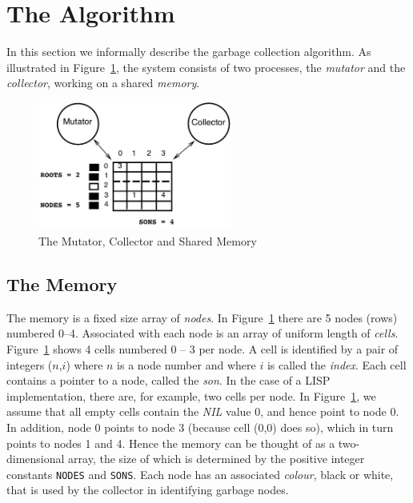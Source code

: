          
\section{The Algorithm}
\label{informal-specification}

In  this  section   we  informally  describe the   garbage  collection
algorithm.   As illustrated  in    Figure~\ref{gc-figure}, the  system
consists of two processes, the  {\em mutator} and the {\em collector},
working on a shared {\em memory}.

\begin{figure}[htb]
\center
\includegraphics[width=2.5in]{gc-fig.jpeg}
\caption{The Mutator, Collector and Shared Memory}
\label{gc-figure}
\end{figure}

\subsection{The Memory}

The memory is a fixed size array of  {\em nodes}.  In
Figure~\ref{gc-figure} there 
are 5 nodes (rows) numbered 0--4.  Associated with  each node is an
array of uniform  length of {\em cells}.     Figure~\ref{gc-figure} shows
4 cells numbered 0 -- 3 per node.  A cell is  identified by a pair
of  integers ($n$,$i$) where  $n$ is  a node number  and where  $i$ is
called   the {\em index}.   Each  cell  contains a pointer   to a node,
called the {\em son}.  In the case   of a LISP  implementation, there  are, for
example, two  cells per node.  In   Figure~\ref{gc-figure}, we  assume
that all empty 
cells contain  the  {\em NIL} value 0,   and hence point to   node 0.  In
addition, node 0 points to node 3 (because  cell (0,0) does so), which
in turn points to nodes 1 and  4.  Hence the memory  can be thought of
as a two-dimensional  array, the  size of  which is  determined by the
positive integer constants  {\tt NODES} and {\tt  SONS}\@.   Each node
has an  associated  {\em colour},  black or white,  that  is used by the
collector in identifying garbage nodes.

